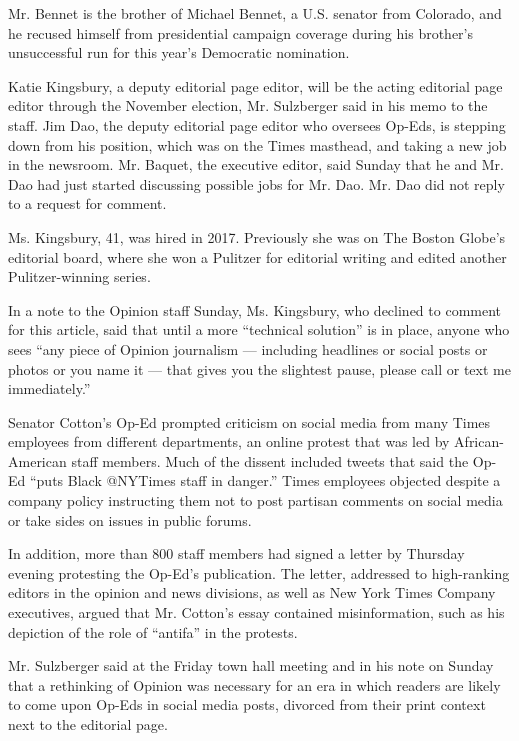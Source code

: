 Mr. Bennet is the brother of Michael Bennet, a U.S. senator from
Colorado, and he recused himself from presidential campaign coverage
during his brother's unsuccessful run for this year's Democratic
nomination.

Katie Kingsbury, a deputy editorial page editor, will be the acting
editorial page editor through the November election, Mr. Sulzberger said
in his memo to the staff. Jim Dao, the deputy editorial page editor who
oversees Op-Eds, is stepping down from his position, which was on the
Times masthead, and taking a new job in the newsroom. Mr. Baquet, the
executive editor, said Sunday that he and Mr. Dao had just started
discussing possible jobs for Mr. Dao. Mr. Dao did not reply to a request
for comment.

Ms. Kingsbury, 41, was hired in 2017. Previously she was on The Boston
Globe's editorial board, where she won a Pulitzer for editorial writing
and edited another Pulitzer-winning series.

In a note to the Opinion staff Sunday, Ms. Kingsbury, who declined to
comment for this article, said that until a more ``technical solution''
is in place, anyone who sees ``any piece of Opinion journalism ---
including headlines or social posts or photos or you name it --- that
gives you the slightest pause, please call or text me immediately.''

Senator Cotton's Op-Ed prompted criticism on social media from many
Times employees from different departments, an online protest that was
led by African-American staff members. Much of the dissent included
tweets that said the Op-Ed ``puts Black @NYTimes staff in danger.''
Times employees objected despite a company policy instructing them not
to post partisan comments on social media or take sides on issues in
public forums.

In addition, more than 800 staff members had signed a letter by Thursday
evening protesting the Op-Ed's publication. The letter, addressed to
high-ranking editors in the opinion and news divisions, as well as New
York Times Company executives, argued that Mr. Cotton's essay contained
misinformation, such as his depiction of the role of ``antifa'' in the
protests.

Mr. Sulzberger said at the Friday town hall meeting and in his note on
Sunday that a rethinking of Opinion was necessary for an era in which
readers are likely to come upon Op-Eds in social media posts, divorced
from their print context next to the editorial page.

